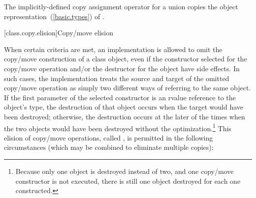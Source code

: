 \pnum
The implicitly-defined copy assignment operator for a
union  copies the object representation~(\ref{basic.types}) of .%
%

[class.copy.elision]{Copy/move elision}%

\pnum
{}%
%
%
%
%
When certain criteria are met, an implementation is
allowed to omit the copy/move construction of a class object,
even if the constructor selected for the copy/move operation and/or the
destructor for the object have
%
side effects.  In such cases, the
implementation treats the source and target of the
omitted copy/move operation as simply two different ways of
referring to the same object. If the first parameter of the
selected constructor is an rvalue reference to the object's type,
the destruction of that object occurs when the target would have been destroyed;
otherwise, the destruction occurs at the later of the times when the
two objects would have been destroyed without the
optimization.\footnote{Because only one object is destroyed instead of two,
and one copy/move constructor
is not executed, there is still one object destroyed for each one constructed.}
This elision of copy/move operations, called
%
%
,
is permitted in the
following circumstances (which may be combined to
eliminate multiple copies):

